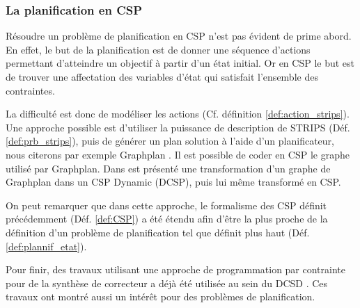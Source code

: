 	\subsubsection{La planification en CSP}
	\vspace{-0.2cm}
	Résoudre un problème de planification en CSP n'est pas évident de prime abord. En effet, le but de la planification est de donner une séquence d'actions permettant d'atteindre un objectif à partir d'un état initial. Or en CSP le but est de trouver une affectation des variables d'état qui satisfait l'ensemble des contraintes.
	
	La difficulté est donc de modéliser les actions (Cf. définition \ref{def:action_strips}). Une approche possible est d'utiliser la puissance de description de STRIPS (Déf. \ref{def:prb_strips}), puis de générer un plan solution à l'aide d'un planificateur, nous citerons par exemple Graphplan \cite{Blu97}. 
	Il est possible de coder en CSP le graphe utilisé par Graphplan. Dans \cite{kambhampati_planning_2000} est présenté une transformation d'un graphe de Graphplan dans un CSP Dynamic (DCSP), puis lui même transformé en CSP.
	
	On peut remarquer que dans cette approche, le formalisme des CSP définit précédemment (Déf. \ref{def:CSP}) a été étendu afin d'être la plus proche de la définition d'un problème de planification tel que définit plus haut (Déf. \ref{def:plannif_etat}). 
	
	Pour finir, des travaux utilisant une approche de programmation par contrainte pour de la synthèse de correcteur a déjà été utilisée au sein du DCSD \cite{verfaillie}. Ces travaux ont montré aussi un intérêt pour des problèmes de planification.	
	\noindent

